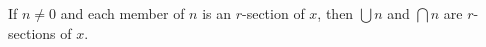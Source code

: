 If $n \neq 0$ and each member of $n$ is an $r$-section of $x$, then $\bigcup n$ and $\bigcap n$ are $r$-sections of $x$.
